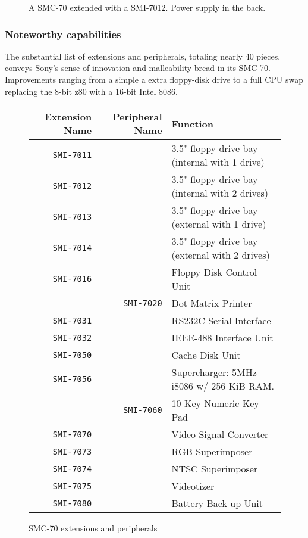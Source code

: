 \begin{figure}[H]
\caption*{A SMC-70 extended with a SMI-7012. Power supply in the back.}
\end{figure}

\subsubsection{Noteworthy capabilities}
The substantial list of extensions and peripherals, totaling nearly 40 pieces, conveys Sony's sense of innovation and malleability bread in its SMC-70. Improvements ranging from a simple a extra floppy-disk drive to a full CPU swap replacing the 8-bit z80 with a 16-bit Intel 8086.  

\begin{figure}[H]

\begin{tabularx}{\textwidth}{rrX} 
  \toprule 
  \textbf{Extension Name} & \textbf{Peripheral Name} & \textbf{Function} \\               
  \toprule    
\texttt{SMI-7011} & & 3.5" floppy drive bay (internal with 1 drive)\\ 
\texttt{SMI-7012} & & 3.5" floppy drive bay (internal with 2 drives)\\ 
\texttt{SMI-7013} & & 3.5" floppy drive bay (external with 1 drive)\\ 
\texttt{SMI-7014} & & 3.5" floppy drive bay (external with 2 drives)\\ 
\texttt{SMI-7016} & & Floppy Disk Control Unit\\ 
 & \texttt{SMI-7020} & Dot Matrix Printer\\ 
\texttt{SMI-7031} & & RS232C Serial Interface\\ 
\texttt{SMI-7032} & & IEEE-488 Interface Unit\\ 
\texttt{SMI-7050} & & Cache Disk Unit\\ 
\texttt{SMI-7056} & & Supercharger: 5MHz i8086 w/ 256 KiB RAM.\\ 
 & \texttt{SMI-7060} & 10-Key Numeric Key Pad\\ 
\texttt{SMI-7070} & & Video Signal Converter\\ 
\texttt{SMI-7073} & & RGB Superimposer\\ 
\texttt{SMI-7074} & & NTSC Superimposer\\ 
\texttt{SMI-7075} & & Videotizer\\ 
\texttt{SMI-7080} & & Battery Back-up Unit\\ 
\toprule
\end{tabularx}%
\caption*{SMC-70 extensions and peripherals\cite{smc70tech}}
\end{figure}


